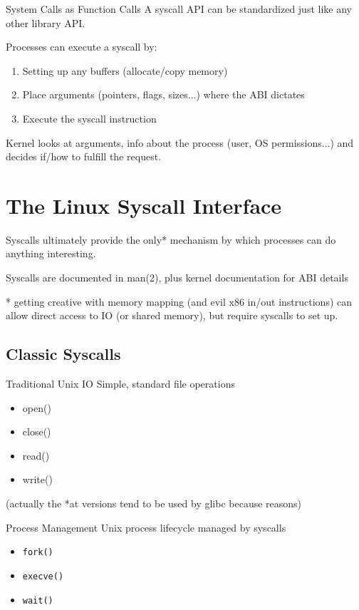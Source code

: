 \documentclass[handout]{beamer}
\begin{document}
\begin{frame}{System Calls as Function Calls}
 A syscall API can be standardized just like any other library API.

 \pause
 Processes can execute a syscall by:
 \begin{enumerate}
  \item Setting up any buffers (allocate/copy memory)
  \item Place arguments (pointers, flags, sizes...) where the ABI dictates
  \item Execute the syscall instruction
 \end{enumerate}
 
 Kernel looks at arguments, info about the process (user, OS permissions...) and decides if/how
 to fulfill the request.
\end{frame}

\section{The Linux Syscall Interface}

\begin{frame}
 Syscalls ultimately provide the only* mechanism by which processes can do
 anything interesting.
 
 Syscalls are documented in man(2), plus kernel documentation for ABI details
 \pause
 
 * getting creative with memory mapping (and evil x86 in/out instructions) can allow
 direct access to IO (or shared memory), but require syscalls to set up.
\end{frame}

\subsection{Classic Syscalls}
\begin{frame}{Traditional Unix IO}
Simple, standard file operations
   \begin{itemize}
    \item open()
    \item close()
    \item read()
    \item write()
   \end{itemize}
 
 \pause
 (actually the *at versions tend to be used by glibc because reasons)
\end{frame}

\begin{frame}{Process Management}
 Unix process lifecycle managed by syscalls
 \begin{itemize}
  \item \texttt{fork()}
  \item \texttt{execve()}
  \item \texttt{wait()}
 \end{itemize}
\end{frame}
\end{document}
